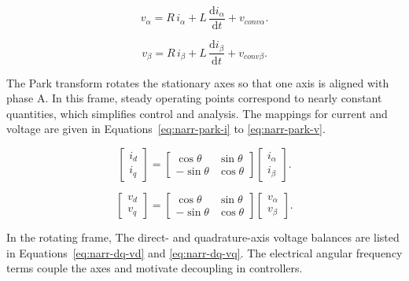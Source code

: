 \begin{equation}
\label{eq:add-ab-volt-a}
 v_\alpha = R \, i_\alpha + L \, \frac{\mathrm d i_\alpha}{\mathrm d t} + v_{conv\alpha} .
\end{equation}

\begin{equation}
\label{eq:add-ab-volt-b}
 v_\beta = R \, i_\beta + L \, \frac{\mathrm d i_\beta}{\mathrm d t} + v_{conv\beta} .
\end{equation}



The Park transform rotates the stationary axes so that one axis is aligned with phase A. In this frame, steady operating points correspond to nearly constant quantities, which simplifies control and analysis. The mappings for current and voltage are given in Equations~\eqref{eq:narr-park-i} to \eqref{eq:narr-park-v}.



\begin{equation}
\label{eq:narr-park-i}
\begin{bmatrix} i_d \\ i_q \end{bmatrix}
= \begin{bmatrix} \cos \theta & \sin \theta \\ -\sin \theta & \cos \theta \end{bmatrix}
\begin{bmatrix} i_\alpha \\ i_\beta \end{bmatrix} .
\end{equation}



\begin{equation}
\label{eq:narr-park-v}
\begin{bmatrix} v_d \\ v_q \end{bmatrix}
= \begin{bmatrix} \cos \theta & \sin \theta \\ -\sin \theta & \cos \theta \end{bmatrix}
\begin{bmatrix} v_\alpha \\ v_\beta \end{bmatrix} .
\end{equation}



In the rotating frame, The direct- and quadrature-axis voltage balances are listed in Equations~\eqref{eq:narr-dq-vd} and \eqref{eq:narr-dq-vq}. The electrical angular frequency terms couple the axes and motivate decoupling in controllers.



